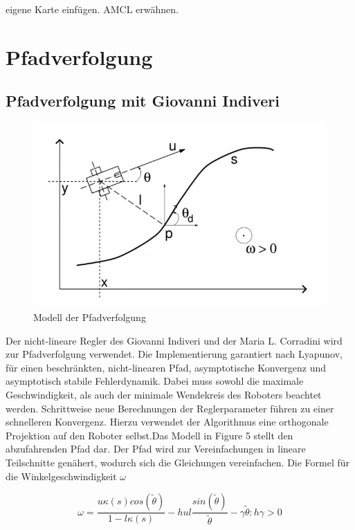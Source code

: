 \documentclass[11pt,a4paper]{article}
\begin{document}
{eigene Karte einfügen. AMCL erwähnen.


\section{Pfadverfolgung}
\subsection{Pfadverfolgung mit Giovanni Indiveri}
\cite{Giovanni}


\begin{figure}[h]
	\includegraphics[width=\linewidth]{pictures/Pfadverfolgung.JPG}
	\caption{Modell der Pfadverfolgung}
\end{figure}

Der nicht-lineare Regler des Giovanni Indiveri und der Maria L. Corradini wird zur Pfadverfolgung verwendet. Die Implementierung garantiert nach Lyapunov, f\"ur einen beschr\"ankten, nicht-linearen Pfad, asymptotische Konvergenz und asymptotisch stabile Fehlerdynamik. Dabei muss sowohl die maximale Geschwindigkeit, als auch der minimale Wendekreis des Roboters beachtet werden. Schrittweise neue Berechnungen der Reglerparameter f\"uhren zu einer schnelleren Konvergenz. Hierzu verwendet der Algorithmus eine orthogonale Projektion auf den Roboter selbst.Das Modell in Figure 5 stellt den abzufahrenden Pfad dar. Der Pfad wird zur Vereinfachungen in lineare Teilschnitte gen\"ahert, wodurch sich die Gleichungen vereinfachen. Die Formel f\"ur die Winkelgeschwindigkeit $\omega$


\begin{equation}
 \omega=  \frac{u \kappa(s) cos(\tilde{\theta})}{1-l \kappa(s)}-h u l  \frac{sin(\tilde{\theta})}{\tilde{\theta}}-\gamma\tilde{\theta} :h\gamma > 0
\end{equation}\\

}
\end{document}
